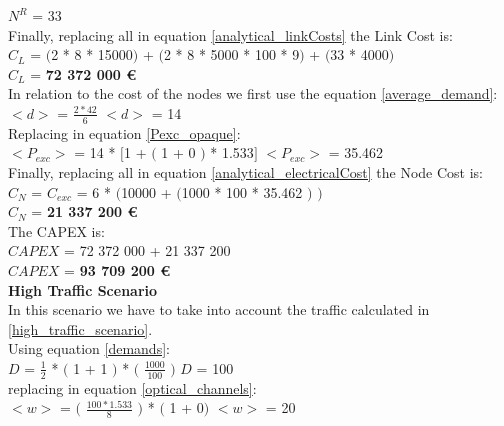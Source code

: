 $N^R$ = 33\\

Finally, replacing all in equation \ref{analytical_linkCosts} the Link Cost is:\\

$C_L$ = $($2 * 8 * 15000$)$ + $($2 * 8 * 5000 * 100 * 9$)$ + $($33 * 4000$)$\\

$C_L$ = \textbf{72 372 000 \euro}\\

In relation to the cost of the nodes we first use the equation \ref{average_demand}:\\

$<d>$ = $\frac{2 * 42}{6}$ \qquad \qquad $<d>$ = 14\\

Replacing in equation \ref{Pexc_opaque}:\\

$<P_{exc}>$ = 14 * $[$1 + $($ 1 + 0 $)$ * 1.533$]$ \qquad \qquad $<P_{exc}>$ = 35.462 \\

Finally, replacing all in equation \ref{analytical_electricalCost} the Node Cost is:\\

$C_N$ = $C_{exc}$ = 6 * $($10000 + $($1000 * 100 * 35.462 $)$ $)$\\

$C_N$ = \textbf{21 337 200 \euro}\\

The CAPEX is:\\
$CAPEX$ = 72 372 000 + 21 337 200\\

$CAPEX$ = \textbf{93 709 200 \euro}\\

\textbf{High Traffic Scenario}\\
In this scenario we have to take into account the traffic calculated in \ref{high_traffic_scenario}.\\

Using equation \ref{demands}:\\

$D$ = $\frac{1}{2}$ * $($ 1 + 1 $)$ * $($ $\frac{1000}{100}$ $)$ \qquad \qquad $D$ = 100\\

replacing in equation \ref{optical_channels}:\\

$<w>$ = $($ $\frac{100 * 1.533}{8}$ $)$ * $($ 1 + 0$)$ \qquad \quad $<w>$ = 20\\

